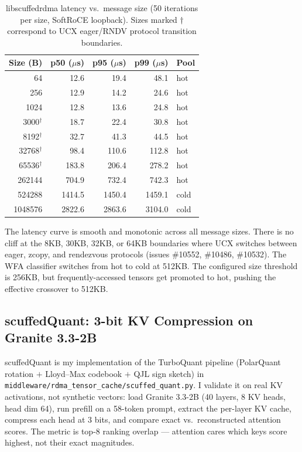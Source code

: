 \documentclass[11pt]{article}
\begin{document}
\begin{table}[h]
\centering
\caption{libscuffedrdma latency vs.\ message size (50 iterations per size, SoftRoCE loopback). Sizes marked $\dag$ correspond to UCX eager/RNDV protocol transition boundaries.}
\label{tab:ucx_comparison}
\begin{tabular}{rrrrl}
\toprule
Size (B) & p50 ($\mu$s) & p95 ($\mu$s) & p99 ($\mu$s) & Pool \\
\midrule
64 & 12.6 & 19.4 & 48.1 & hot \\
256 & 12.9 & 14.2 & 24.6 & hot \\
1024 & 12.8 & 13.6 & 24.8 & hot \\
3000$^\dag$ & 18.7 & 22.4 & 30.8 & hot \\
8192$^\dag$ & 32.7 & 41.3 & 44.5 & hot \\
32768$^\dag$ & 98.4 & 110.6 & 112.8 & hot \\
65536$^\dag$ & 183.8 & 206.4 & 278.2 & hot \\
262144 & 704.9 & 732.4 & 742.3 & hot \\
524288 & 1414.5 & 1450.4 & 1459.1 & cold \\
1048576 & 2822.6 & 2863.6 & 3104.0 & cold \\
\bottomrule
\end{tabular}
\end{table}

The latency curve is smooth and monotonic across all message sizes. There is no cliff at the 8KB, 30KB, 32KB, or 64KB boundaries where UCX switches between eager, zcopy, and rendezvous protocols (issues \#10552, \#10486, \#10532). The WFA classifier switches from hot to cold at 512KB. The configured size threshold is 256KB, but frequently-accessed tensors get promoted to hot, pushing the effective crossover to 512KB.

\subsection{scuffedQuant: 3-bit KV Compression on Granite 3.3-2B}
\label{sec:scuffedquant-results}

scuffedQuant is my implementation of the TurboQuant pipeline (PolarQuant rotation $+$ Lloyd--Max codebook $+$ QJL sign sketch) in \texttt{middleware/rdma\_tensor\_cache/scuffed\_quant.py}. I validate it on real KV activations, not synthetic vectors: load Granite 3.3-2B (40 layers, 8 KV heads, head dim 64), run prefill on a 58-token prompt, extract the per-layer KV cache, compress each head at 3 bits, and compare exact vs.\ reconstructed attention scores. The metric is top-8 ranking overlap --- attention cares which keys score highest, not their exact magnitudes.
\end{document}
